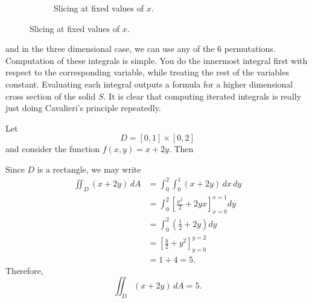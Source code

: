 \begin{figure}[H]
\begin{subfigure}[b]{0.48\textwidth}
      \caption{Slicing at fixed values of $x$.}
    \end{subfigure}
  \end{figure}
  and in the three dimensional case, we can use any of the 6 permutations. Computation of these integrals is simple. You do the innermost integral first with respect to the corresponding variable, while treating the rest of the variables constant. Evaluating each integral outputs a formula for a higher dimensional cross section of the solid $S$. It is clear that computing iterated integrals is really just doing Cavalieri's principle repeatedly. 

  \begin{example}
    Let 
    \[D = [0,1] \times [0,2]\]
    and consider the function $f(x,y) = x + 2y$. Then 
    \begin{center}
    \end{center}
    Since $D$ is a rectangle, we may write
    \begin{align*}
      \iint_D (x+2y)\,dA
      &= \int_0^2 \int_0^1 (x+2y)\,dx\,dy \\
      &= \int_0^2 \left[ \frac{x^2}{2} + 2yx \right]_{x=0}^{x=1} dy \\
      &= \int_0^2 \left( \frac{1}{2} + 2y \right) dy \\
      &= \left[ \frac{y}{2} + y^2 \right]_{y=0}^{y=2} \\
      &= 1 + 4 = 5.
    \end{align*}
    Therefore,
    \[\iint_D (x+2y)\,dA = 5.\]
  \end{example}

